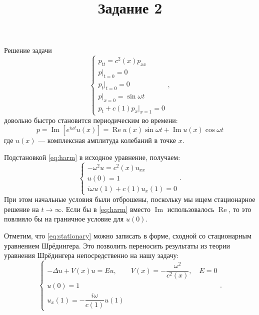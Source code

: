 \documentclass[12pt]{article}
\title{Задание 2}
\date{}
\begin{document}
\maketitle

Решение задачи
\[
\begin{cases}
p_{tt} = c^2(x) p_{xx}\\
p\big|_{t = 0} = 0\\
p_t\big|_{t = 0} = 0\\
p\big|_{x = 0} = \sin \omega t\\
p_t + c(1) p_x \big|_{x = 1} = 0
\end{cases},
\]
довольно быстро становится периодическим во времени:
\begin{equation}
p = \operatorname{Im} \left[e^{i \omega t} u(x)\right] = 
\operatorname{Re} u(x) \sin \omega t +
\operatorname{Im} u(x) \cos \omega t
\label{eq:harm}
\end{equation}
где $u(x)$ --- комплексная амплитуда колебаний в точке $x$.

Подстановкой \eqref{eq:harm} в исходное уравнение, получаем:
\begin{equation}
\begin{cases}
-\omega^2 u = c^2(x) u_{xx}\\
u(0) = 1\\
i\omega u(1) + c(1) u_x(1) = 0
\end{cases}.
\label{eq:stationary}
\end{equation}
При этом начальные условия были отброшены, поскольку мы ищем стационарное
решение на $t \rightarrow \infty$. Если бы в \eqref{eq:harm} вместо 
$\operatorname{Im}$ использовалось $\operatorname{Re}$, то это повлияло бы на
граничное условие для $u(0)$.

Отметим, что \eqref{eq:stationary} можно записать в форме, сходной со
стационарным уравнением Шрёдингера. Это позволить переносить результаты из
теории уравнения Шрёдингера непосредственно на нашу задачу:
\[
\begin{cases}
- \Delta u + V(x) u = E u, \qquad V(x) =
-\dfrac{\omega^2}{c^2(x)}, \quad E = 0\\
u(0) = 1\\
u_x(1) = -\dfrac{i\omega}{c(1)} u(1)
\end{cases}.
\label{eq:shroedinger}
\]
\end{document}
